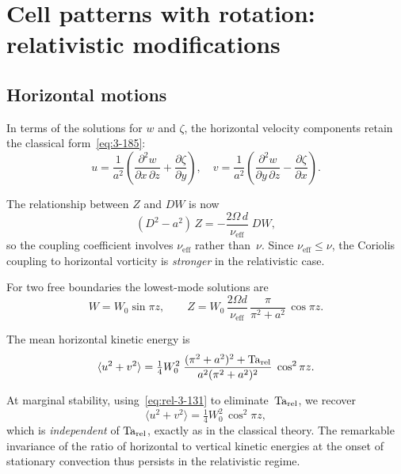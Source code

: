 \section{Cell patterns with rotation: relativistic modifications}
\label{sec:rel-3-28}

\subsection*{Horizontal motions}

In terms of the solutions for $w$ and $\zeta$, the horizontal velocity
components retain the classical form~\eqref{eq:3-185}:
\begin{equation}\label{eq:rel-3-185}
  u = \frac{1}{a^2}\!\left(
    \frac{\partial^2 w}{\partial x\,\partial z}
    + \frac{\partial\zeta}{\partial y}\right), \quad
  v = \frac{1}{a^2}\!\left(
    \frac{\partial^2 w}{\partial y\,\partial z}
    - \frac{\partial\zeta}{\partial x}\right).
\end{equation}

The relationship between $Z$ and $DW$ is now
\begin{equation}\label{eq:rel-3-188}
  (D^2 - a^2)\,Z
  = -\frac{2\Omega\,d}{\nu_{\mathrm{eff}}}\;DW,
\end{equation}
so the coupling coefficient involves $\nu_{\mathrm{eff}}$ rather
than~$\nu$.  Since $\nu_{\mathrm{eff}} \leq \nu$, the Coriolis coupling
to horizontal vorticity is \emph{stronger} in the relativistic case.

For two free boundaries the lowest-mode solutions are
\begin{equation}\label{eq:rel-3-192}
  W = W_0\sin\pi z, \qquad
  Z = W_0\,\frac{2\Omega d}{\nu_{\mathrm{eff}}}
      \,\frac{\pi}{\pi^2+a^2}\,\cos\pi z.
\end{equation}

The mean horizontal kinetic energy is
\begin{equation}\label{eq:rel-3-193}
  \langle u^2 + v^2 \rangle
  = \tfrac14 W_0^2\;
    \frac{(\pi^2+a^2)^2 + \mathrm{Ta}_{\mathrm{rel}}}{a^2(\pi^2+a^2)^2}\;\cos^2\pi z.
\end{equation}

At marginal stability, using~\eqref{eq:rel-3-131} to
eliminate~$\mathrm{Ta}_{\mathrm{rel}}$, we recover
\begin{equation}\label{eq:rel-3-195}
  \langle u^2 + v^2 \rangle
  = \tfrac14 W_0^2\,\cos^2\pi z,
\end{equation}
which is \emph{independent} of $\mathrm{Ta}_{\mathrm{rel}}$, exactly as in the classical
theory.  The remarkable invariance of the ratio of horizontal to
vertical kinetic energies at the onset of stationary convection
thus persists in the relativistic regime.

